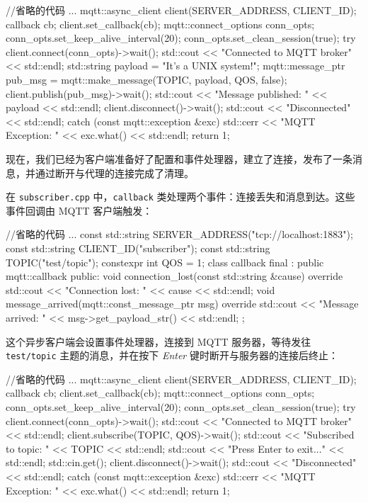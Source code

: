 \begin{codebox}[cpp]
//省略的代码
...
mqtt::async_client client(SERVER_ADDRESS, CLIENT_ID);
callback cb;
client.set_callback(cb);
mqtt::connect_options conn_opts;
conn_opts.set_keep_alive_interval(20);
conn_opts.set_clean_session(true);
try {
  client.connect(conn_opts)->wait();
  std::cout << "Connected to MQTT broker" << std::endl;
  std::string payload = "It's a UNIX system!";
  mqtt::message_ptr pub_msg = mqtt::make_message(TOPIC, payload, QOS, false);
  client.publish(pub_msg)->wait();
  std::cout << "Message published: " << payload << std::endl;
  client.disconnect()->wait();
  std::cout << "Disconnected" << std::endl;
} catch (const mqtt::exception &exc) {
  std::cerr << "MQTT Exception: " << exc.what() << std::endl;
  return 1;
}
\end{codebox}

现在，我们已经为客户端准备好了配置和事件处理器，建立了连接，发布了一条消息，并通过断开与代理的连接完成了清理。

在 \texttt{subscriber.\allowbreak{}cpp} 中，\texttt{callback} 类处理两个事件：连接丢失和消息到达。这些事件回调由 MQTT 客户端触发：

\begin{codebox}[cpp]
//省略的代码
...
const std::string SERVER_ADDRESS("tcp://localhost:1883");
const std::string CLIENT_ID("subscriber");
const std::string TOPIC("test/topic");
constexpr int QOS = 1;
class callback final : public mqtt::callback {
public:
  void connection_lost(const std::string &cause) override {
    std::cout << "Connection lost: " << cause << std::endl;
  }
  void message_arrived(mqtt::const_message_ptr msg) override {
    std::cout << "Message arrived: " << msg->get_payload_str() << std::endl;
  }
};
\end{codebox}

\label{idx:1522}
这个异步客户端会设置事件处理器，连接到 MQTT 服务器，等待发往 \texttt{test/\allowbreak{}topic} 主题的消息，并在按下 \emph{Enter} 键时断开与服务器的连接后终止：

\begin{codebox}[cpp]
//省略的代码
...
mqtt::async_client client(SERVER_ADDRESS, CLIENT_ID);
callback cb;
client.set_callback(cb);
mqtt::connect_options conn_opts;
conn_opts.set_keep_alive_interval(20);
conn_opts.set_clean_session(true);
try {
  client.connect(conn_opts)->wait();
  std::cout << "Connected to MQTT broker" << std::endl;
  client.subscribe(TOPIC, QOS)->wait();
  std::cout << "Subscribed to topic: " << TOPIC << std::endl;
  std::cout << "Press Enter to exit..." << std::endl;
  std::cin.get();
  client.disconnect()->wait();
  std::cout << "Disconnected" << std::endl;
} catch (const mqtt::exception &exc) {
  std::cerr << "MQTT Exception: " << exc.what() << std::endl;
  return 1;
}
\end{codebox}

